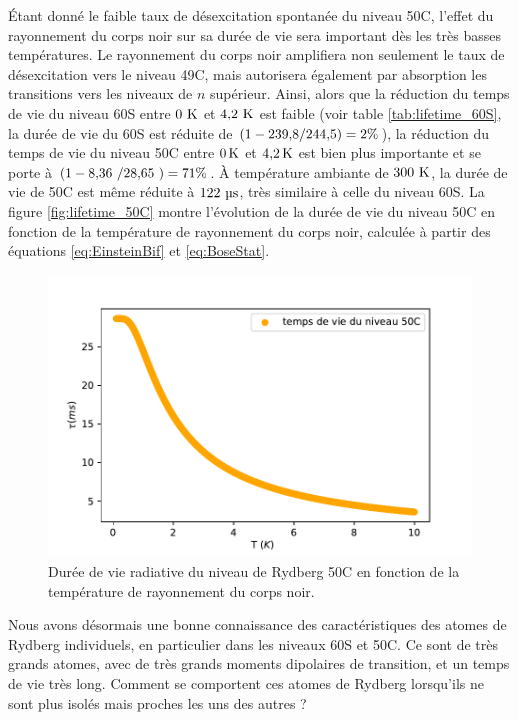 Étant donné le faible taux de désexcitation spontanée du niveau 50C, l'effet du rayonnement du corps noir sur sa durée de vie sera important dès les très basses températures.
Le rayonnement du corps noir amplifiera non seulement le taux de désexcitation vers le niveau 49C, mais autorisera également par absorption les transitions vers les niveaux de $n$ supérieur.
Ainsi, alors que la réduction du temps de vie du niveau 60S entre $\numv{0}\si{\kelvin}$ et $\numv{4.2}\si{\kelvin}$ est faible (voir table \ref{tab:lifetime_60S}, la durée de vie du 60S est réduite de $(1-\numvv{239.8}/\numvv{244.5}) = 2\%$), la réduction du temps de vie du niveau 50C entre $\SIvv{0}{\K}$ et $\SIvv{4.2}{\K}$ est bien plus importante et se porte à $(1-\numv{8.36}/\numv{28.65}) = 71\%$.
\`A température ambiante de $\numv{300}\si{\kelvin}$, la durée de vie de 50C est même réduite à $\numv{122}\si{\micro\second}$, très similaire à celle du niveau 60S.
La figure \eqref{fig:lifetime_50C} montre l'évolution de la durée de vie du niveau 50C en fonction de la température de rayonnement du corps noir, calculée à partir des équations \eqref{eq:EinsteinBif} et \eqref{eq:BoseStat}.


\begin{figure}[!h]
	\centering
	\includegraphics[width=0.8\linewidth]{figures/theory/lifetime_50C}
	\caption[Durée de vie du niveau 50C]{Durée de vie radiative du niveau de Rydberg 50C en fonction de la température de rayonnement du corps noir.}
	\label{fig:lifetime_50C}
\end{figure}

\newpage
Nous avons désormais une bonne connaissance des caractéristiques des atomes de Rydberg individuels, en particulier dans les niveaux 60S et 50C.
Ce sont de très grands atomes, avec de très grands moments dipolaires de transition, et un temps de vie très long.
Comment se comportent ces atomes de Rydberg lorsqu'ils ne sont plus isolés mais proches les uns des autres ?

